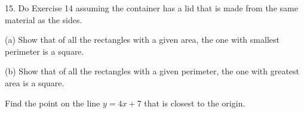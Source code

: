 \documentclass{sebase}
\begin{document}
\begin{multicols}{2}
\begin{ExerciseList}
%

\item[\hfill 15.] Do Exercise 14 assuming the container has a lid that is
made from the same material as the sides.

%

%

\item[{\hfill {\protect\fbox{\hspace{-2pt}16.\hspace{-2pt}}}}] 

\begin{ExerciseList}
\item[(a)] Show that of all the rectangles with a given area, the one with
smallest perimeter is a square.

%

\item[(b)] Show that of all the rectangles with a given perimeter, the one
with greatest area is a square.

%
\end{ExerciseList}

\item[{\hfill {\protect\fbox{\hspace{-2pt}17.\hspace{-2pt}}}}] Find the point
on the line $y=4x+7$ that is closest to the origin.

%


\end{ExerciseList}
\end{multicols}
\end{document}
